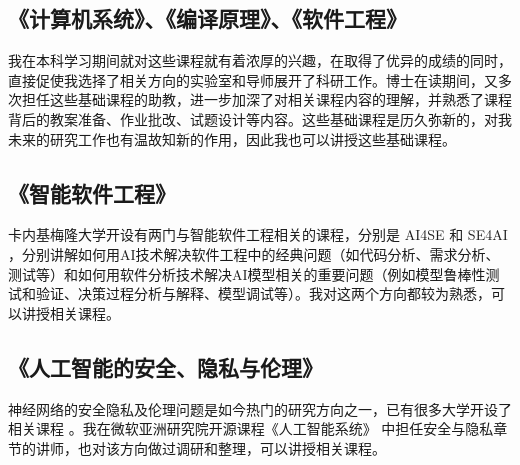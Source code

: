 \documentclass[12pt]{article}
\begin{document}
\subsection{《计算机系统》、《编译原理》、《软件工程》}
我在本科学习期间就对这些课程就有着浓厚的兴趣，在取得了优异的成绩的同时，直接促使我选择了相关方向的实验室和导师展开了科研工作。博士在读期间，又多次担任这些基础课程的助教，进一步加深了对相关课程内容的理解，并熟悉了课程背后的教案准备、作业批改、试题设计等内容。这些基础课程是历久弥新的，对我未来的研究工作也有温故知新的作用，因此我也可以讲授这些基础课程。

\subsection{《智能软件工程》}
卡内基梅隆大学开设有两门与智能软件工程相关的课程，分别是 AI4SE \cite{cmu:ai4se} 和 SE4AI \cite{cmu:se4ai}，分别讲解如何用AI技术解决软件工程中的经典问题（如代码分析、需求分析、测试等）和如何用软件分析技术解决AI模型相关的重要问题（例如模型鲁棒性测试和验证、决策过程分析与解释、模型调试等）。我对这两个方向都较为熟悉，可以讲授相关课程。

\subsection{《人工智能的安全、隐私与伦理》}
神经网络的安全隐私及伦理问题是如今热门的研究方向之一，已有很多大学开设了相关课程 \cite{ucb:trustworthy,ucb:fairness}。我在微软亚洲研究院开源课程《人工智能系统》 \cite{microsoft:ai-system}中担任安全与隐私章节的讲师，也对该方向做过调研和整理，可以讲授相关课程。




{


}
\end{document}
